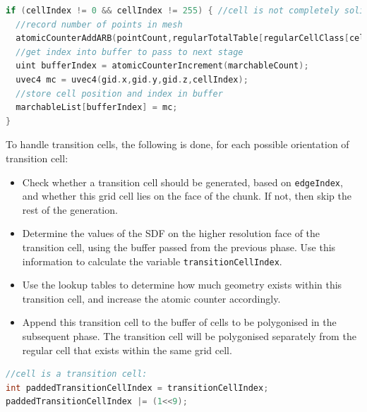 \documentclass[11pt]{article}
\begin{document}
\begin{enumerate}
\begin{lstlisting}[language=C++,label={tv_count_regular},caption={Code for counting the number of vertices and marchable grid cells in the chunk. Variable \texttt{cellIndex} is calculated according to listing \ref{tv_transition_tables}, using the SDF values from the previous stage.}]
if (cellIndex != 0 && cellIndex != 255) { //cell is not completely solid or air
  //record number of points in mesh
  atomicCounterAddARB(pointCount,regularTotalTable[regularCellClass[cellIndex]]);
  //get index into buffer to pass to next stage
  uint bufferIndex = atomicCounterIncrement(marchableCount);
  uvec4 mc = uvec4(gid.x,gid.y,gid.z,cellIndex);
  //store cell position and index in buffer
  marchableList[bufferIndex] = mc;
}
\end{lstlisting}
To handle transition cells, the following is done, for each possible orientation of transition cell:
\begin{itemize}
  \item Check whether a transition cell should be generated, based on \texttt{edgeIndex}, and whether this grid cell lies on the face of the chunk. If not, then skip the rest of the generation.
  \item Determine the values of the SDF on the higher resolution face of the transition cell, using the buffer passed from the previous phase. Use this information to calculate the variable \texttt{transitionCellIndex}.
  \item Use the lookup tables to determine how much geometry exists within this transition cell, and increase the atomic counter accordingly.
  \item Append this transition cell to the buffer of cells to be polygonised in the subsequent phase. The transition cell will be polygonised separately from the regular cell that exists within the same grid cell.
\end{itemize}

\begin{lstlisting}[language=C++,label={tv_count},caption={Part of the code responsible for counting the triangles in transition cells, and appending them to the geometry generation buffer. The first 9 bits of \texttt{paddedTransitionCellIndex} store the value of \texttt{transitionCellIndex}, calculated as shown in figure \ref{fig:tv_transition_cellIndex}. Bit 10 records that the cell is a transition cell, and exactly one of bits 11-16 will be set, to store the orientation of the cell.}]
//cell is a transition cell:
int paddedTransitionCellIndex = transitionCellIndex;
paddedTransitionCellIndex |= (1<<9);


\end{lstlisting}
\end{enumerate}
\end{document}
